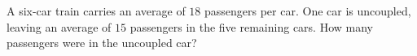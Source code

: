 A six-car train carries an average of $18$ passengers per car. One car is uncoupled, leaving an average of $15$ passengers in the five remaining cars. How many passengers were in the uncoupled car?
